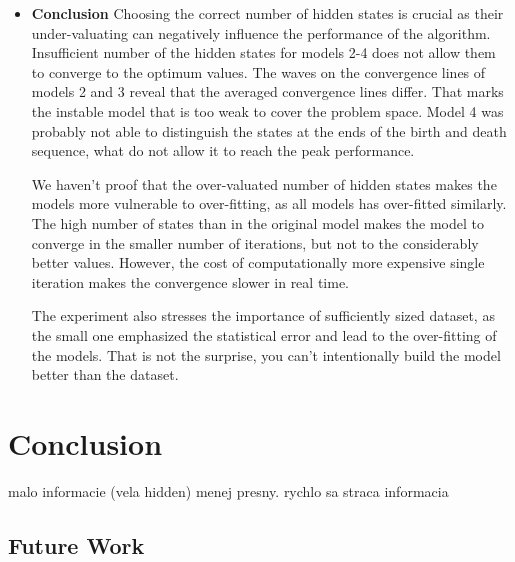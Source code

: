 \documentclass[thesis=M,english]{FITthesis}[2012/10/20]
\begin{document}
\begin{itemize}
\item \textbf{ Conclusion }
Choosing the correct number of hidden states is crucial as their under-valuating can negatively influence the performance of the algorithm. Insufficient number of the hidden states for models 2-4 does not allow them to converge to the optimum values. The waves on the convergence lines of models 2 and 3 reveal that the averaged convergence lines differ. That marks the instable model that is too weak to cover the problem space. Model 4 was probably not able to distinguish the states at the ends of the birth and death sequence, what do not allow it to reach the peak performance.

We haven't proof that the over-valuated number of hidden states makes the models more vulnerable to over-fitting, as all models has over-fitted similarly. The high number of states than in the original model makes the model to converge in the smaller number of iterations, but not to the considerably better values. However, the cost of computationally more expensive single iteration makes the convergence slower in real time.

The experiment also stresses the importance of sufficiently sized dataset, as the small one emphasized the statistical error and lead to the over-fitting of the models. That is not the surprise, you can't intentionally build the model better than the dataset. 
\end{itemize}






\chapter{Conclusion}

malo informacie (vela hidden) menej presny.
rychlo sa straca informacia 

\section{Future Work}
\end{document}
